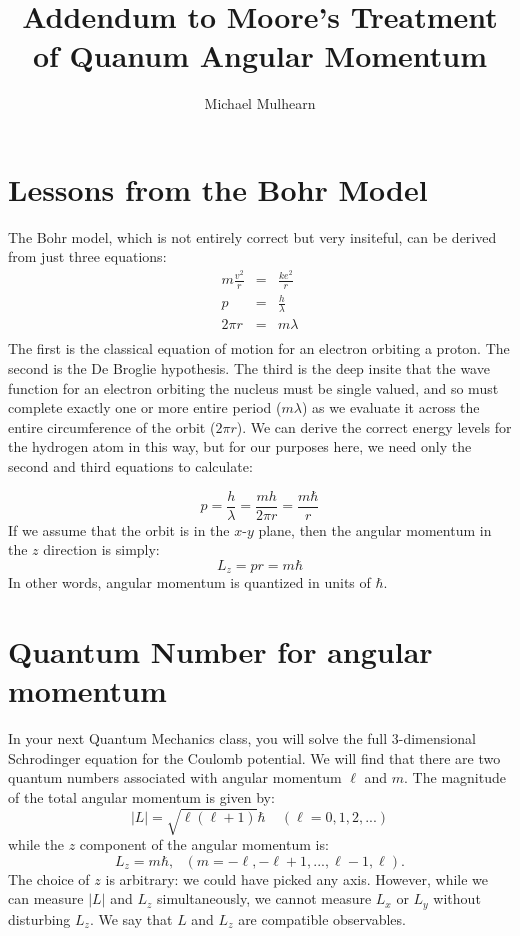 \documentclass[12pt]{article}
\begin{document}
\title{Addendum to Moore's Treatment of Quanum Angular Momentum}
\author{Michael Mulhearn}

\maketitle

\section{Lessons from the Bohr Model}

The Bohr model, which is not entirely correct but very insiteful, can be derived from just three equations:
\begin{eqnarray*}
m \frac{v^2}{r} &=& \frac{k e^2}{ r } \\
p &=& \frac{h}{\lambda} \\
2 \pi r &=& m \lambda \\
\end{eqnarray*}
The first is the classical equation of motion for an electron orbiting a proton.  The second is the De Broglie hypothesis.  The third is the deep insite that the wave function for an electron orbiting the nucleus must be single valued, and so must complete exactly one or more entire period ($m \lambda$) as we evaluate it across the entire circumference of the orbit ($2\pi r$).  We can derive the correct energy levels for the hydrogen atom in this way, but for our purposes here, we need only the second and third equations to calculate:

\begin{equation*}
p = \frac{h}{\lambda} = \frac{m h }{2 \pi r} = \frac{m \hbar}{r}
\end{equation*}
If we assume that the orbit is in the $x$-$y$ plane, then the angular momentum in the $z$ direction is simply:
\begin{equation*}
L_z = pr = m \hbar
\end{equation*}
In other words, angular momentum is quantized in units of $\hbar$.

\section{Quantum Number for angular momentum}

In your next Quantum Mechanics class, you will solve the full 3-dimensional Schrodinger equation for the Coulomb potential.  We will find that there are two quantum numbers associated with angular momentum $\ell$ and $m$.  The magnitude of the total angular momentum is given by:
\begin{equation*}
|L| = \sqrt{\ell (\ell + 1)} \hbar ~~~~~(\ell=0,1,2,...)
\end{equation*}
while the $z$ component of the angular momentum is:
\begin{equation*}
L_z = m \hbar, ~~~(m=-\ell, -\ell+1, ..., \ell-1, \ell).
\end{equation*}
The choice of $z$ is arbitrary:  we could have picked any axis.  However, while we can measure $|L|$ and $L_z$ simultaneously, we cannot measure $L_x$ or $L_y$ without disturbing $L_z$.  We say that $L$ and $L_z$ are compatible observables.
\end{document}
